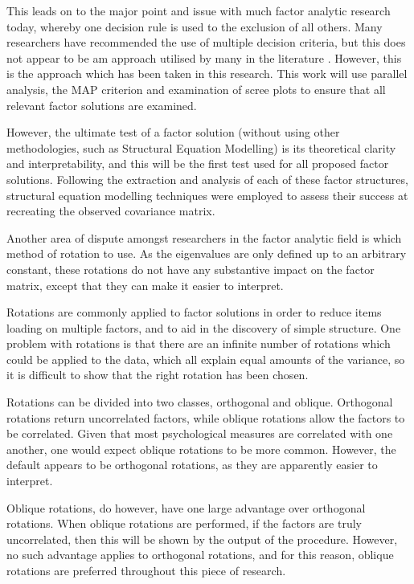 This leads on to the major point and issue with much factor analytic research today, whereby one decision rule is used to the exclusion of all others. Many researchers have recommended the use of multiple decision criteria, but this does not appear to be am approach utilised by many in the literature \cite{henson2006use}\cite{sass2010comparative}. However, this is the approach which has been taken in this research. This work will use parallel analysis, the MAP criterion and examination of scree plots to ensure that all relevant factor solutions are examined.

However, the ultimate test of a factor solution (without using other methodologies, such as Structural Equation Modelling) \cite{joreskog1978structural} is its theoretical clarity and interpretability, and this will be the first test used for all proposed factor solutions. Following the extraction and analysis of each of these factor structures, structural equation modelling techniques were employed to assess their success at recreating the observed covariance matrix. 

Another area of dispute amongst researchers in the factor analytic field is which method of rotation to use\cite{sass2010comparative}. As the eigenvalues are only defined up to an arbitrary constant, these rotations do not have any substantive impact on the factor matrix, except that they can make it easier to interpret. 

Rotations are commonly applied to factor solutions in order to reduce items loading on multiple factors, and to aid in the discovery of simple structure\cite{henson2006use}. One problem with rotations is that there are an infinite number of rotations which could be applied to the data, which all explain equal amounts of the variance, so it is difficult to show that the right rotation has been chosen.  

Rotations can be divided into two classes, orthogonal and oblique\cite{sass2010comparative}. Orthogonal rotations return uncorrelated factors, while oblique rotations allow the factors to be correlated. Given that most psychological measures are correlated with one another, one would expect oblique rotations to be more common. However, the default appears to be orthogonal rotations, as they are apparently easier to interpret\cite{henson2006use}. 

Oblique rotations, do however, have one large advantage over orthogonal rotations. When oblique rotations are performed, if the factors are truly uncorrelated, then this will be shown by the output of the procedure\cite{venables2002modern}. However, no such advantage applies to orthogonal rotations, and for this reason, oblique rotations are preferred throughout this piece of research. 

